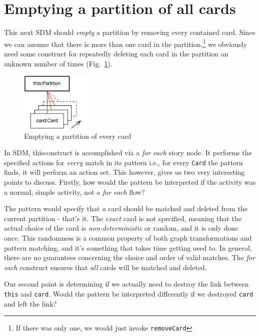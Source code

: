 \newpage
\hypertarget{sec:emptyPartition}{}
\section{Emptying a partition of all cards}
\genHeader

This next SDM should \emph{empty} a partition by removing every contained card. Since we can assume that there is more than one card in the
partition,\footnote{If there was only one, we would just invoke \texttt{removeCard}} we obviously need some construct for repeatedly deleting each card in the
partition an unknown number of times (Fig.~\ref{fig:goal_empty}). 

\begin{figure}[htbp]
	\centering
  \includegraphics[width=0.3\textwidth]{goal_partitionEmpty.pdf}
	\caption{Emptying a partition of every card}
	\label{fig:goal_empty}
\end{figure}
\FloatBarrier

In SDM, thisconstruct is accomplished via a \emph{for each} story node. It performs the specified actions for \emph{every} match in its
pattern i.e., for every \texttt{Card} the pattern finds, it will perform an action set. This however, gives us two very interesting points to discuss. Firstly,
how would the pattern be interpreted if the activity was a normal, simple activity, not a \emph{for each} flow?

The pattern would specify that \emph{a} card should be matched and deleted from the current partition - that's it. The \emph{exact} card is not specified,
meaning that the actual choice of the card is \emph{non-deterministic} or random, and it is only done once. This randomness is a common property of both graph
transformations and pattern matching, and it's something that takes time getting used to.  In general, there are no guarantees concerning the choice and
order of valid matches. The \emph{for each} construct ensures that \emph{all} cards will be matched and deleted.

Our second point is determining if we actually need to destroy the link between \texttt{this} and \texttt{card}. Would the pattern be interpreted differently if we
destroyed \texttt{card} and left the link?

